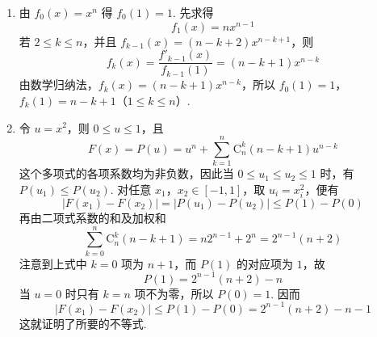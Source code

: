 \begin{solution}
\begin{enumerate}
\item 由 \(f_0(x)=x^n\) 得 \(f_0(1)=1\). 先求得
\[
f_1(x)=nx^{n-1}
\]
若 \(2\leqslant k\leqslant n\)，并且 \(f_{k-1}(x)=(n-k+2)x^{n-k+1}\)，则
\[
f_k(x)=\frac{f'_{k-1}(x)}{f_{k-1}(1)}=(n-k+1)x^{n-k}
\]
由数学归纳法，\(f_k(x)=(n-k+1)x^{n-k}\)，所以 \(f_0(1)=1\)，\(f_k(1)=n-k+1\)（\(1\leqslant k\leqslant n\)）.

\item 令 \(u=x^2\)，则 \(0\leqslant u\leqslant1\)，且
\[
F(x)=P(u)=u^n+\sum_{k=1}^{n}\mathrm C_n^k(n-k+1)u^{n-k}
\]
这个多项式的各项系数均为非负数，因此当 \(0\leqslant u_1\leqslant u_2\leqslant1\) 时，有 \(P(u_1)\leqslant P(u_2)\). 对任意 \(x_1\)，\(x_2\in[-1,1]\)，取 \(u_i=x_i^2\)，便有
\[
|F(x_1)-F(x_2)|=|P(u_1)-P(u_2)|\leqslant P(1)-P(0)
\]
再由二项式系数的和及加权和
\[
\sum_{k=0}^{n}\mathrm C_n^k(n-k+1)=n2^{n-1}+2^n=2^{n-1}(n+2)
\]
注意到上式中 \(k=0\) 项为 \(n+1\)，而 \(P(1)\) 的对应项为 \(1\)，故
\[
P(1)=2^{n-1}(n+2)-n
\]
当 \(u=0\) 时只有 \(k=n\) 项不为零，所以 \(P(0)=1\). 因而
\[
|F(x_1)-F(x_2)|\leqslant P(1)-P(0)=2^{n-1}(n+2)-n-1
\]
这就证明了所要的不等式.
\end{enumerate}
\end{solution}
